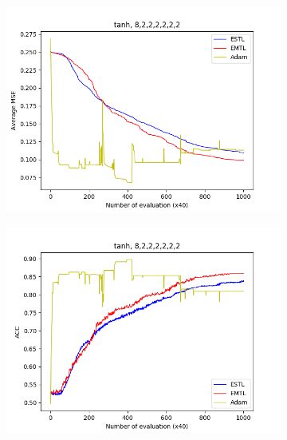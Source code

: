\documentclass[conference]{IEEEtran}
\theoremstyle{definition}
\begin{document}
\begin{figure}
      \begin{subfigure}{0.48\linewidth}
        \centering
        \includegraphics[width=1.0\linewidth]{images/tanh/avg_mse8,2,2,2,2,2,2.png}
      \end{subfigure}
      \begin{subfigure}{0.48\linewidth}
        \centering
        \includegraphics[width=1.0\linewidth]{images/tanh/avg_acc8,2,2,2,2,2,2.png}
      \end{subfigure}
    \end{figure}
\end{document}
